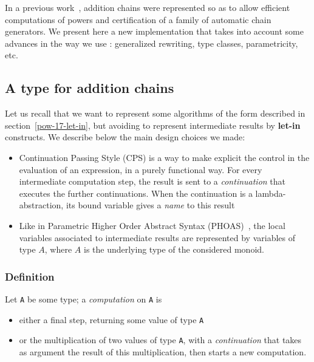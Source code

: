 In a previous work~\cite{DBLP:journals/ita/BrlekCHM95, DBLP:conf/tapsoft/BrlekCS91,AdditionsContrib},  addition chains were represented so as to allow
efficient computations of powers and certification of a family of
automatic chain generators.
  We present here a new implementation that takes into account some
advances in the way we use \coq{}: generalized rewriting, type classes,
parametricity, etc.


\subsection{A type for addition chains}

Let us recall that we want to represent some algorithms of the form
described in section~\ref{pow-17-let-in}, but avoiding to represent
intermediate results by \textbf{let-in}  constructs.
We describe below the main design choices we made:

\begin{itemize}
\item Continuation Passing Style (CPS) 
 \cite{reynolds93}
is a way to make explicit the 
     control in the evaluation of an expression, in a purely functional way. 
    For every intermediate computation step, the result is sent
    to a \emph{continuation} that executes the further continuations.
   When the continuation is a lambda-abstraction, its bound variable 
   gives a \emph{name} to this result


  
\item Like in Parametric Higher Order Abstract Syntax (PHOAS)~\cite{PHOAS}, 
     the local variables associated to intermediate results are
     represented by variables of  type $A$, where $A$ is the underlying type
  of the considered monoid.
\end{itemize}


\subsubsection{Definition}
\label{computation-def}
Let  \texttt{A} be some type;  a \emph{computation} on \texttt{A} is 
\begin{itemize}
\item  either a final step, returning some value of type \texttt{A}
\item or the multiplication of two values of type  \texttt{A}, with a  \emph{continuation}
  that takes as argument the result of this multiplication, then starts a new
  computation.
\end{itemize}
  
